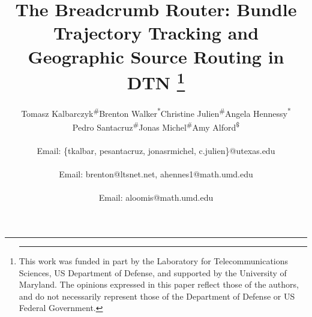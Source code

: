 \title{The Breadcrumb Router: Bundle Trajectory Tracking and Geographic Source Routing in DTN
\thanks{\hrule\vspace{0.1in} This work was funded in part by the Laboratory
for Telecommunications Sciences, US Department of Defense, and
supported by the University of Maryland.  The opinions
expressed in this paper reflect those of the authors, and do not
necessarily represent those of the Department of Defense or US Federal
Government.}}

\author{
\alignauthor
Tomasz Kalbarczyk\textsuperscript{\#}\quad Brenton
Walker\textsuperscript{*}\quad Christine
Julien\textsuperscript{\#}\quad Angela
Hennessy\textsuperscript{*}\quad\\
Pedro
Santacruz\textsuperscript{\#}\quad Jonas Michel\textsuperscript{\#}\quad Amy
Alford\textsuperscript{\$}\quad \\  
\\
Email: \{tkalbar, pesantacruz, jonasrmichel, c.julien\}@utexas.edu\\
\\
Email: brenton@ltsnet.net, ahennes1@math.umd.edu\\
\\
Email: aloomis@math.umd.edu
}



\maketitle
